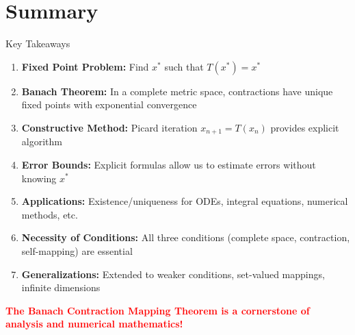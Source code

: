\documentclass[aspectratio=169,10pt]{beamer}
\begin{document}
\section{Summary}

\begin{frame}{Key Takeaways}
    \begin{enumerate}
        \item \textbf{Fixed Point Problem:} Find $x^*$ such that $T(x^*) = x^*$

        \item \textbf{Banach Theorem:} In a complete metric space, contractions have unique fixed points with exponential convergence

        \item \textbf{Constructive Method:} Picard iteration $x_{n+1} = T(x_n)$ provides explicit algorithm

        \item \textbf{Error Bounds:} Explicit formulas allow us to estimate errors without knowing $x^*$

        \item \textbf{Applications:} Existence/uniqueness for ODEs, integral equations, numerical methods, etc.

        \item \textbf{Necessity of Conditions:} All three conditions (complete space, contraction, self-mapping) are essential

        \item \textbf{Generalizations:} Extended to weaker conditions, set-valued mappings, infinite dimensions
    \end{enumerate}

    \vspace{0.3cm}
    \begin{center}
        \textcolor{red}{\textbf{The Banach Contraction Mapping Theorem is a cornerstone of analysis and numerical mathematics!}}
    \end{center}
\end{frame}
\end{document}
